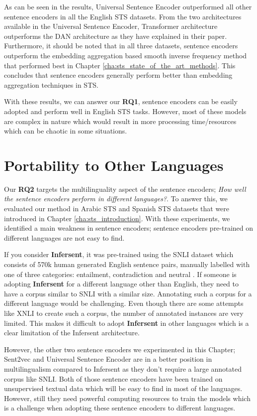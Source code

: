 As can be seen in the results, Universal Sentence Encoder outperformed all other sentence encoders in all the English STS datasets. From the two architectures available in the Universal Sentence Encoder, Transformer architecture outperforms the DAN architecture as they have explained in their paper. Furthermore, it should be noted that in all three datasets, sentence encoders outperform the embedding aggregation based smooth inverse frequency method that performed best in Chapter \ref{cha:sts_state_of_the_art_methods}. This concludes that sentence encoders generally perform better than embedding aggregation techniques in STS. 

With these results, we can answer our \textbf{RQ1}, sentence encoders can be easily adopted and perform well in English STS tasks. However, most of these models are complex in nature which would result in more processing time/resources which can be chaotic in some situations. 


\section{Portability to Other Languages}
\label{sec:sentence_languages}
Our \textbf{RQ2} targets the multilinguality aspect of the sentence encoders; \textit{How well the sentence encoders perform in different languages?}. To answer this, we evaluated our method in Arabic STS and Spanish STS datasets that were introduced in Chapter \ref{cha:sts_introduction}. With these experiments, we identified a main weakness in sentence encoders; sentence encoders pre-trained on different languages are not easy to find. 

If you consider \textbf{Infersent}, it was pre-trained using the SNLI dataset which consists of 570k human generated English sentence pairs, manually labelled with one of three categories: entailment, contradiction and neutral \cite{bowman-etal-2015-large}. If someone is adopting \textbf{Infersent} for a different language other than English, they need to have a corpus similar to SNLI with a similar size. Annotating such a corpus for a different language would be challenging. Even though there are some attempts like XNLI \cite{conneau-etal-2018-xnli} to create such a corpus, the number of annotated instances are very limited. This makes it difficult to adopt \textbf{Infersent} in other languages which is a clear limitation of the Infersent architecture. 

However, the other two sentence encoders we experimented in this Chapter; Sent2vec and Universal Sentence Encoder are in a better position in multilingualism compared to Infersent as they don't require a large annotated corpus like SNLI. Both of those sentence encoders have been trained on unsupervised textual data which will be easy to find in most of the languages. However, still they need powerful computing resources to train the models which is a challenge when adopting these sentence encoders to different languages. 

